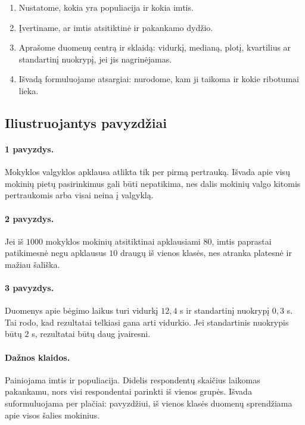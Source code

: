 \begin{enumerate}
\item Nustatome, kokia yra populiacija ir kokia imtis.
\item Įvertiname, ar imtis atsitiktinė ir pakankamo dydžio.
\item Aprašome duomenų centrą ir sklaidą: vidurkį, medianą, plotį, kvartilius ar standartinį nuokrypį, jei jis nagrinėjamas.
\item Išvadą formuluojame atsargiai: nurodome, kam ji taikoma ir kokie ribotumai lieka.
\end{enumerate}

\subsection{Iliustruojantys pavyzdžiai}

\paragraph{1 pavyzdys.}
Mokyklos valgyklos apklausa atlikta tik per pirmą pertrauką. Išvada apie visų mokinių pietų pasirinkimus gali būti nepatikima, nes dalis mokinių valgo kitomis pertraukomis arba visai neina į valgyklą.

\paragraph{2 pavyzdys.}
Jei iš $1000$ mokyklos mokinių atsitiktinai apklausiami $80$, imtis paprastai patikimesnė negu apklausus $10$ draugų iš vienos klasės, nes atranka platesnė ir mažiau šališka.

\paragraph{3 pavyzdys.}
Duomenys apie bėgimo laikus turi vidurkį $12,4$ s ir standartinį nuokrypį $0,3$ s. Tai rodo, kad rezultatai telkiasi gana arti vidurkio. Jei standartinis nuokrypis būtų $2$ s, rezultatai būtų daug įvairesni.

\paragraph{Dažnos klaidos.}
Painiojama imtis ir populiacija. Didelis respondentų skaičius laikomas pakankamu, nors visi respondentai parinkti iš vienos grupės. Išvada suformuluojama per plačiai: pavyzdžiui, iš vienos klasės duomenų sprendžiama apie visos šalies mokinius.

